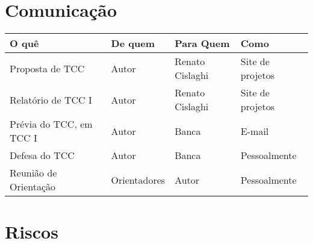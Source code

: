\section{Comunicação}
    \begin{tabular}{l l l l}
        \hline
        O quê  & De quem & Para Quem & Como \\
        \hline
        Proposta de TCC         & Autor     & Renato Cislaghi   & Site de projetos \\
        Relatório de TCC I      & Autor     & Renato Cislaghi   & Site de projetos \\
        Prévia do TCC, em TCC I & Autor     & Banca             & E-mail \\
        Defesa do TCC           & Autor     & Banca             & Pessoalmente \\
        Reunião de Orientação   & Orientadores  & Autor         & Pessoalmente \\
        \hline
    \end{tabular}


\section{Riscos}

